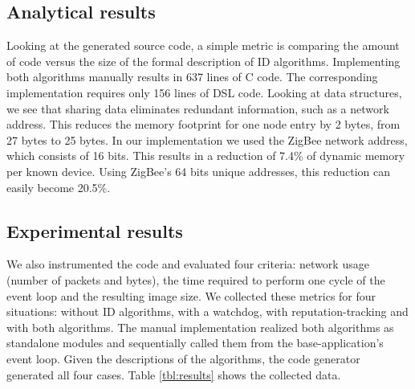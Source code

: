 \documentclass[3p,times,procedia]{elsarticle}
\begin{document}
\subsection{Analytical results}

Looking at the generated source code, a simple metric is comparing the amount
of code versus the size of the formal description of ID algorithms.
Implementing both algorithms manually results in 637 lines of C code. The
corresponding \FOO implementation requires only 156 lines of DSL code. Looking
at data structures, we see that sharing data eliminates redundant information,
such as a network address. This reduces the memory footprint for one node entry
by 2 bytes, from 27 bytes to 25 bytes. In our implementation we used the ZigBee
network address, which consists of 16 bits. This results in a reduction of
7.4\% of dynamic memory per known device. Using ZigBee's 64 bits unique
addresses, this reduction can easily become 20.5\%.

\subsection{Experimental results}

We also instrumented the code and evaluated four criteria: network usage
(number of packets and bytes), the time required to perform one cycle of the
event loop and the resulting image size. We collected these metrics for four
situations: without ID algorithms, with a watchdog, with reputation-tracking
and with both algorithms. The manual implementation realized both algorithms as
standalone modules and sequentially called them from the base-application's
event loop. Given the \FOO descriptions of the algorithms, the code generator
generated all four cases. Table \ref{tbl:results} shows the collected data.
\end{document}

